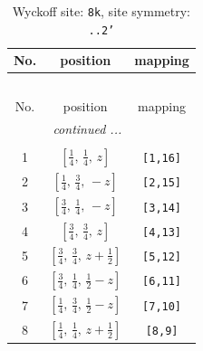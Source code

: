 \documentclass[fleqn,8pt]{jsarticle}
\begin{document}
\begin{longtable}{ccc}
\caption{Wyckoff site: {\tt 8k}, site symmetry: {\tt ..2'}}
 \\
 \hline \hline
No. & position & mapping \\ \hline \endfirsthead

\multicolumn{2}{l}{\tablename\ \thetable{}} \\
 \hline \hline
No. & position & mapping \\ \hline \endhead

 \hline \hline
\multicolumn{2}{r}{\footnotesize\it continued ...} \\ \endfoot

 \hline \hline
\multicolumn{2}{r}{} \\ \endlastfoot

1 & $\left[ \frac{1}{4},\, \frac{1}{4},\, z \right]$ & {\tt [1,16]} \\ \hline
2 & $\left[ \frac{1}{4},\, \frac{3}{4},\, - z \right]$ & {\tt [2,15]} \\ \hline
3 & $\left[ \frac{3}{4},\, \frac{1}{4},\, - z \right]$ & {\tt [3,14]} \\ \hline
4 & $\left[ \frac{3}{4},\, \frac{3}{4},\, z \right]$ & {\tt [4,13]} \\ \hline
5 & $\left[ \frac{3}{4},\, \frac{3}{4},\, z + \frac{1}{2} \right]$ & {\tt [5,12]} \\ \hline
6 & $\left[ \frac{3}{4},\, \frac{1}{4},\, \frac{1}{2} - z \right]$ & {\tt [6,11]} \\ \hline
7 & $\left[ \frac{1}{4},\, \frac{3}{4},\, \frac{1}{2} - z \right]$ & {\tt [7,10]} \\ \hline
8 & $\left[ \frac{1}{4},\, \frac{1}{4},\, z + \frac{1}{2} \right]$ & {\tt [8,9]} \\
\end{longtable}
\renewcommand{\arraystretch}{1.2}
\end{document}
